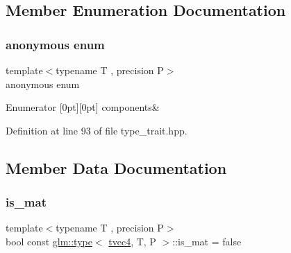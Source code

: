 \subsection{Member Enumeration Documentation}
\mbox{\label{structglm_1_1type_3_01tvec4_00_01_t_00_01_p_01_4_ac22629bf2a70fe88597c6cc55469bdff}} 
\subsubsection{\texorpdfstring{anonymous enum}{anonymous enum}}
{\footnotesize\ttfamily template$<$typename T , precision P$>$ \\
anonymous enum}

\begin{DoxyEnumFields}{Enumerator}
[0pt][0pt]{}\mbox{\label{structglm_1_1type_3_01tvec4_00_01_t_00_01_p_01_4_ac22629bf2a70fe88597c6cc55469bdffad536a7b1b80cbeebc90ea091fbf001c7}} 
components&\\
\hline

\end{DoxyEnumFields}


Definition at line 93 of file type\+\_\+trait.\+hpp.



\subsection{Member Data Documentation}
\mbox{\label{structglm_1_1type_3_01tvec4_00_01_t_00_01_p_01_4_a1dbc37d661357604961a167bedc7e69e}} 
\subsubsection{\texorpdfstring{is\_mat}{is\_mat}}
{\footnotesize\ttfamily template$<$typename T , precision P$>$ \\
bool const \mbox{\hyperlink{structglm_1_1type}{glm\+::type}}$<$ \mbox{\hyperlink{structglm_1_1tvec4}{tvec4}}, T, P $>$\+::is\+\_\+mat = false\hspace{0.3cm}{\ttfamily [static]}}



